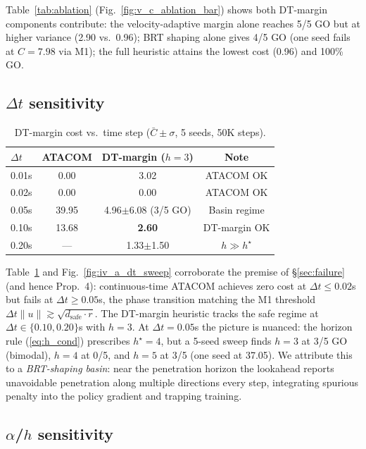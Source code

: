 \documentclass[letterpaper]{article}
\begin{document}
Table~\ref{tab:ablation} (Fig.~\ref{fig:v_c_ablation_bar}) shows both DT-margin components contribute: the velocity-adaptive margin alone reaches 5/5 GO but at higher variance (2.90 vs.\ 0.96); BRT shaping alone gives 4/5 GO (one seed fails at $C=7.98$ via M1); the full heuristic attains the lowest cost (0.96) and 100\% GO.

\subsection{$\Delta t$ sensitivity}
\label{sec:dt-sweep}

\begin{table}[t]
\centering
\caption{DT-margin cost vs.\ time step ($\bar C \pm \sigma$, 5 seeds, 50K steps).}
\label{tab:dt}
\begin{tabular}{lccc}
\toprule
$\Delta t$ & ATACOM & DT-margin ($h{=}3$) & Note \\
\midrule
0.01s  & 0.00  & 3.02 & ATACOM OK \\
0.02s  & 0.00  & 0.00 & ATACOM OK \\
0.05s  & 39.95 & 4.96$\pm$6.08 (3/5 GO) & Basin regime \\
0.10s  & 13.68 & \textbf{2.60} & DT-margin OK \\
0.20s  &  ---  & 1.33$\pm$1.50 & $h\!\gg\!h^\star$ \\
\bottomrule
\end{tabular}
\end{table}



Table~\ref{tab:dt} and Fig.~\ref{fig:iv_a_dt_sweep} corroborate the premise of \S\ref{sec:failure} (and hence Prop.~4): continuous-time ATACOM achieves zero cost at $\Delta t \le 0.02$s but fails at $\Delta t \ge 0.05$s, the phase transition matching the M1 threshold $\Delta t\|u\| \gtrsim \sqrt{d_\text{safe}\cdot r}$. The DT-margin heuristic tracks the safe regime at $\Delta t \in \{0.10, 0.20\}$s with $h{=}3$. At $\Delta t{=}0.05$s the picture is nuanced: the horizon rule (\ref{eq:h_cond}) prescribes $h^\star{=}4$, but a 5-seed sweep finds $h{=}3$ at 3/5 GO (bimodal), $h{=}4$ at 0/5, and $h{=}5$ at 3/5 (one seed at 37.05). We attribute this to a \emph{BRT-shaping basin}: near the penetration horizon the lookahead reports unavoidable penetration along multiple directions every step, integrating spurious penalty into the policy gradient and trapping training.

\subsection{$\alpha$/$h$ sensitivity}
\label{sec:alpha-h-sweep}
\end{document}
